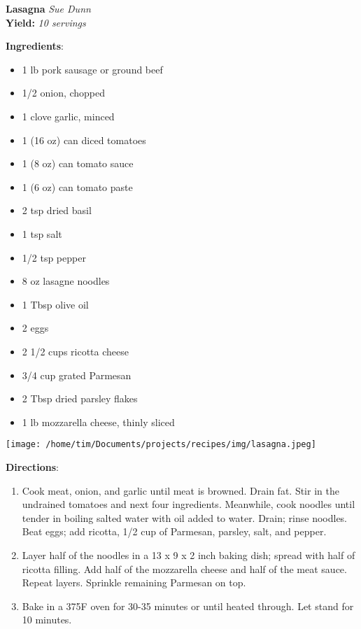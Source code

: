 \documentclass[11pt, twoside, openany]{book}
\begin{document}
\noindent\begin{minipage}[t]{\linewidth}%
{\Large\textbf{Lasagna}} \label{lasagna}\hfill\textit{Sue Dunn}\\
\textbf{Yield:} \textit{10 servings}\\
\noindent\begin{minipage}[t]{0.78\linewidth}%
\textbf{Ingredients}:\vspace{-3mm}
\begin{multicols}{2}
\begin{itemize}\setlength\itemsep{-1mm}
\item 1 lb pork sausage or ground beef
\item 1/2 onion, chopped
\item 1 clove garlic, minced
\item 1 (16 oz) can diced tomatoes
\item 1 (8 oz) can tomato sauce
\item 1 (6 oz) can tomato paste
\item 2 tsp dried basil
\item 1 tsp salt
\item 1/2 tsp pepper
\item 8 oz lasagne noodles
\item 1 Tbsp olive oil
\item 2 eggs
\item 2 1/2 cups ricotta cheese
\item 3/4 cup grated Parmesan
\item 2 Tbsp dried parsley flakes
\item 1 lb mozzarella cheese, thinly sliced
\end{itemize}
\end{multicols}
\end{minipage}
\noindent\begin{minipage}[t]{0.18\linewidth}
\centering \strut\vspace*{-\baselineskip}\newline
\texttt{[image: /home/tim/Documents/projects/recipes/img/lasagna.jpeg]}\\
\end{minipage}\vspace{3mm}
\textbf{Directions}:
\vspace{-3mm}\begin{enumerate}\setlength\itemsep{-1mm}
\item Cook meat, onion, and garlic until meat is browned. Drain fat. Stir in the undrained tomatoes and next four ingredients. Meanwhile, cook noodles until tender in boiling salted water with oil added to water. Drain; rinse noodles. Beat eggs; add ricotta, 1/2 cup of Parmesan, parsley, salt, and pepper.
\item Layer half of the noodles in a 13 x 9 x 2 inch baking dish; spread with half of ricotta filling. Add half of the mozzarella cheese and half of the meat sauce. Repeat layers. Sprinkle remaining Parmesan on top.
\item Bake in a 375F oven for 30-35 minutes or until heated through. Let stand for 10 minutes.
\end{enumerate}
\end{minipage}\vspace{8mm}
\end{document}
